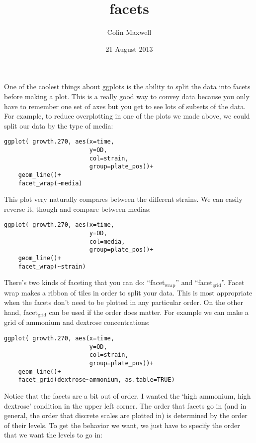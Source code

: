 \documentclass[11pt]{article}
\title{facets}
\author{Colin Maxwell}
\date{21 August 2013}
\begin{document}
\maketitle

\setcounter{tocdepth}{3}
\tableofcontents
\vspace*{1cm}

One of the coolest things about ggplots is the ability to split the
data into facets before making a plot. This is a really good way to
convey data because you only have to remember one set of axes but you
get to see lots of subsets of the data. For example, to reduce
overplotting in one of the plots we made above, we could split our data by the type of media:

\begin{verbatim}
ggplot( growth.270, aes(x=time,
                        y=OD,
                        col=strain,
                        group=plate_pos))+
    geom_line()+
    facet_wrap(~media)
\end{verbatim}


This plot very naturally compares between the different strains. We
can easily reverse it, though and compare between medias:

\begin{verbatim}
ggplot( growth.270, aes(x=time,
                        y=OD,
                        col=media,
                        group=plate_pos))+
    geom_line()+
    facet_wrap(~strain)
\end{verbatim}


There's two kinds of faceting that you can do: ``facet$_{\mathrm{wrap}}$'' and
``facet$_{\mathrm{grid}}$''. Facet wrap makes a ribbon of tiles in order to split
your data. This is most appropriate when the facets don't need to be
plotted in any particular order. On the other hand, facet$_{\mathrm{grid}}$ can be
used if the order does matter. For example we can make a grid of
ammonium and dextrose concentrations:

\begin{verbatim}
ggplot( growth.270, aes(x=time,
                        y=OD,
                        col=strain,
                        group=plate_pos))+
    geom_line()+
    facet_grid(dextrose~ammonium, as.table=TRUE)
\end{verbatim}


Notice that the facets are a bit out of order. I wanted the `high
ammonium, high dextrose' condition in the upper left corner. The order
that facets go in (and in general, the order that discrete scales are
plotted in) is determined by the order of their levels. To get
the behavior we want, we just have to specify the order that we want
the levels to go in:
\end{document}
